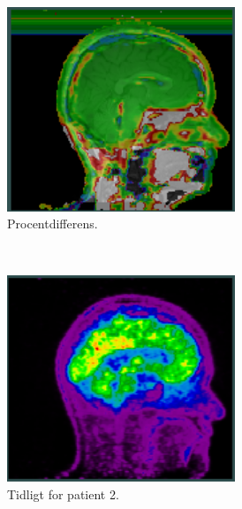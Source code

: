 \begin{figure}
\begin{subfigure}{0.3\textwidth}
        \includegraphics[width=0.75\textwidth]{colager/over_tid_pet/over_tid_121280_pd.png}
        \caption{Procentdifferens.}
        \label{col:over_time_pet_pat1_pd}
    \end{subfigure}\\
    \begin{subfigure}{0.3\textwidth}
        \centering
        \includegraphics[width=0.75\textwidth]{colager/over_tid_pet/over_tid_140547_early.png}
        \caption{Tidligt for patient 2.}
        \label{col:over_time_pet_pat2_early}
    \end{subfigure}\hfill
    \begin{subfigure}{0.3\textwidth}
        \centering

\end{subfigure}
\end{figure}
